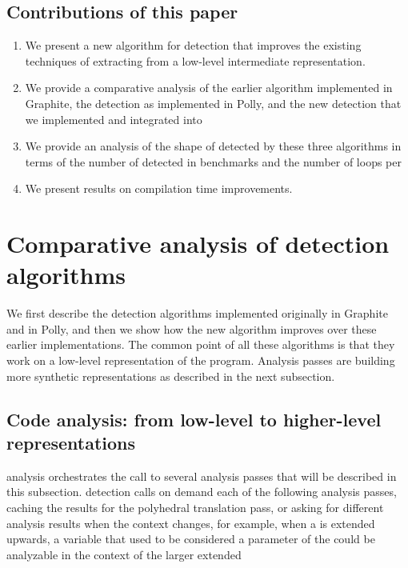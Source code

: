\documentclass{sig-alternate}
\begin{document}
\subsection{Contributions of this paper}
\begin{enumerate}
  \item We present a new algorithm for \SCoP{} detection that improves the
    existing techniques of extracting  from a low-level intermediate
    representation.
  \item We provide a comparative analysis of the earlier algorithm implemented
    in Graphite, the \SCoP{} detection as implemented in \LLVM{-}Polly, and the new
    \SCoP{} detection that we implemented and integrated into 
  \item We provide an analysis of the shape of  detected by these three
    algorithms in terms of the number of  detected in benchmarks and the
    number of loops per 
  \item We present results on compilation time improvements.
\end{enumerate}

\section{Comparative analysis of \SCoP{} detection algorithms}

We first describe the \SCoP{} detection algorithms implemented originally in
Graphite and in Polly, and then we show how the new algorithm improves over
these earlier implementations.  The common point of all these algorithms is that
they work on a low-level representation of the program.  Analysis passes are
building more synthetic representations as described in the next subsection.

\subsection{Code analysis: from low-level to higher-level representations}

\SCoP{} analysis orchestrates the call to several analysis passes that will be
described in this subsection.  \SCoP{} detection calls on demand each of the
following analysis passes, caching the results for the polyhedral translation
pass, or asking for different analysis results when the context changes, for
example, when a \SCoP{} is extended upwards, a variable that used to be
considered a parameter of the \SCoP{} could be analyzable in the context of the
larger extended 
\end{document}
